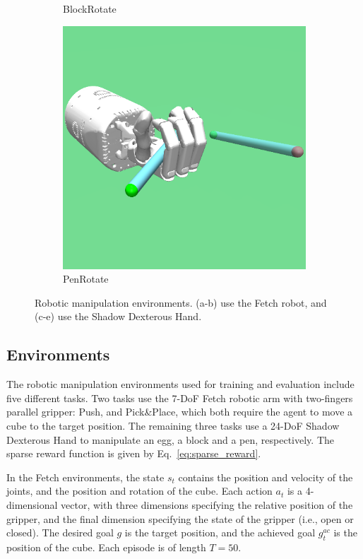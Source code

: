 \begin{figure}
\begin{subfigure}[t]{0.19\textwidth}
    \caption{BlockRotate}
    \label{subfig:env_handblock}
  \end{subfigure}\hfill
  \begin{subfigure}[t]{0.19\textwidth}
    \includegraphics[width=\textwidth]{figures/chapter4/handpen_resize.png}
    \caption{PenRotate}
    \label{subfig:env_handpen}
  \end{subfigure}\hfill
  \caption{Robotic manipulation environments. (a-b) use the Fetch robot, and (c-e) use the Shadow Dexterous Hand.} 
  \label{fig:env}
\end{figure}

\subsection{Environments}
The robotic manipulation environments used for training and evaluation include five different tasks. Two tasks use the 7-DoF Fetch robotic arm with two-fingers parallel gripper: Push, and Pick\&Place, which both require the agent to move a cube to the target position. The remaining three tasks use a 24-DoF Shadow Dexterous Hand to manipulate an egg, a block and a pen, respectively. The sparse reward function is given by Eq.~\eqref{eq:sparse_reward}.

In the Fetch environments, the state $s_{t}$ contains the position and velocity of the joints, and the position and rotation of the cube. Each action $a_{t}$ is a 4-dimensional vector, with three dimensions specifying the relative position of the gripper, and the final dimension specifying the state of the gripper (i.e., open or closed). The desired goal $g$ is the target position, and the achieved goal $g^{ac}_{t}$ is the position of the cube. Each episode is of length $T = 50$.

